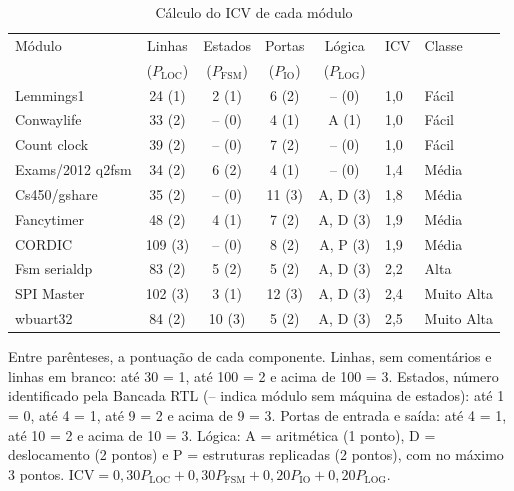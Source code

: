 \begin{table}[htbp]
  \centering
  \caption{Cálculo do ICV de cada módulo}
  \label{tab:ap_icv}
  \footnotesize
  \setlength{\tabcolsep}{4pt}
  \begin{tabular}{@{}lccccll@{}}
    \toprule
    Módulo & Linhas & Estados & Portas & Lógica & ICV & Classe \\
     & ($P_{\mathrm{LOC}}$) & ($P_{\mathrm{FSM}}$) & ($P_{\mathrm{IO}}$) & ($P_{\mathrm{LOG}}$) & & \\
    \midrule
    Lemmings1 & 24 (1) & 2 (1) & 6 (2) & -- (0) & 1,0 & Fácil \\
    Conwaylife & 33 (2) & -- (0) & 4 (1) & A (1) & 1,0 & Fácil \\
    Count clock & 39 (2) & -- (0) & 7 (2) & -- (0) & 1,0 & Fácil \\
    Exams/2012 q2fsm & 34 (2) & 6 (2) & 4 (1) & -- (0) & 1,4 & Média \\
    Cs450/gshare & 35 (2) & -- (0) & 11 (3) & A, D (3) & 1,8 & Média \\
    Fancytimer & 48 (2) & 4 (1) & 7 (2) & A, D (3) & 1,9 & Média \\
    CORDIC & 109 (3) & -- (0) & 8 (2) & A, P (3) & 1,9 & Média \\
    Fsm serialdp & 83 (2) & 5 (2) & 5 (2) & A, D (3) & 2,2 & Alta \\
    SPI Master & 102 (3) & 3 (1) & 12 (3) & A, D (3) & 2,4 & Muito Alta \\
    wbuart32 & 84 (2) & 10 (3) & 5 (2) & A, D (3) & 2,5 & Muito Alta \\
    \bottomrule
  \end{tabular}

  \smallskip
  {\footnotesize Entre parênteses, a pontuação de cada componente. Linhas, sem comentários e linhas em branco: até 30 = 1, até 100 = 2 e acima de 100 = 3. Estados, número identificado pela Bancada RTL (-- indica módulo sem máquina de estados): até 1 = 0, até 4 = 1, até 9 = 2 e acima de 9 = 3. Portas de entrada e saída: até 4 = 1, até 10 = 2 e acima de 10 = 3. Lógica: A = aritmética (1 ponto), D = deslocamento (2 pontos) e P = estruturas replicadas (2 pontos), com no máximo 3 pontos. $\mathrm{ICV} = 0{,}30P_{\mathrm{LOC}} + 0{,}30P_{\mathrm{FSM}} + 0{,}20P_{\mathrm{IO}} + 0{,}20P_{\mathrm{LOG}}$.}
\end{table}


